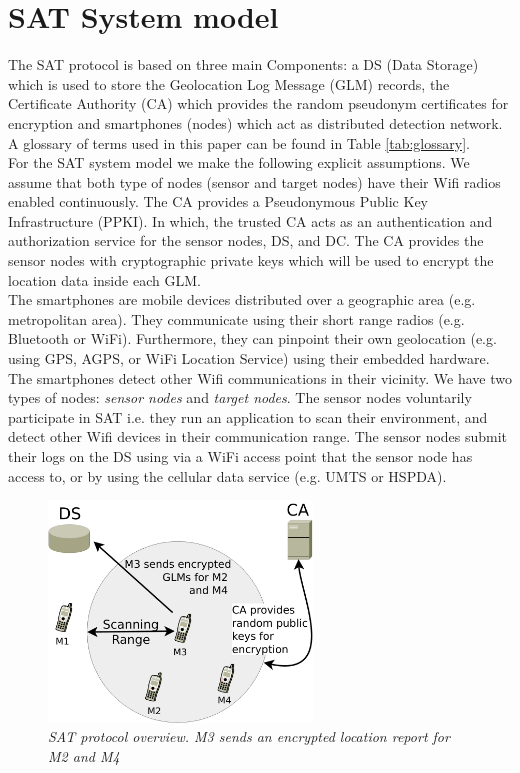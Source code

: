 \documentclass[10pt,titlepage]{article}
\begin{document}
% 








\section{SAT System model}
The SAT protocol is based on three main Components: a DS (Data Storage) which is used to store the Geolocation Log Message (GLM) records, the Certificate Authority (CA) which provides the random pseudonym certificates for encryption and smartphones (nodes) which act as distributed detection network. A glossary of terms used in this paper can be found in Table \ref{tab:glossary}.\\

For the SAT system model we make the following explicit assumptions. We assume that both type of nodes (sensor and target nodes) have their Wifi radios enabled continuously. The CA provides a Pseudonymous Public Key Infrastructure (PPKI). In which, the trusted CA acts as an authentication and authorization service for the sensor nodes, DS, and DC. The CA provides the sensor nodes with cryptographic private keys which will be used to encrypt the location data inside each GLM.\\


The smartphones are mobile devices distributed over a geographic area (e.g. metropolitan area). They communicate using their short range radios (e.g. Bluetooth or WiFi). Furthermore, they can pinpoint their own geolocation (e.g. using GPS, AGPS, or WiFi Location Service) using their embedded hardware. The smartphones detect other Wifi communications in their vicinity. We have two types of nodes: \textit{sensor nodes} and \textit{target nodes}. The sensor nodes voluntarily participate in SAT i.e. they run an application to scan their environment, and detect other Wifi devices in their communication range. The sensor nodes submit their logs on the DS
using via a WiFi access point that the sensor node has access to, or by using the cellular data service (e.g. UMTS or HSPDA).\\


\begin{figure}[h]
\centerline{\includegraphics[width=7cm]{diagram/SAT-overview.pdf}}
\caption{\textit{SAT protocol overview. M3 sends an encrypted location report for M2 and M4}}
\label{fig:sat-example}
\end{figure}
\end{document}

